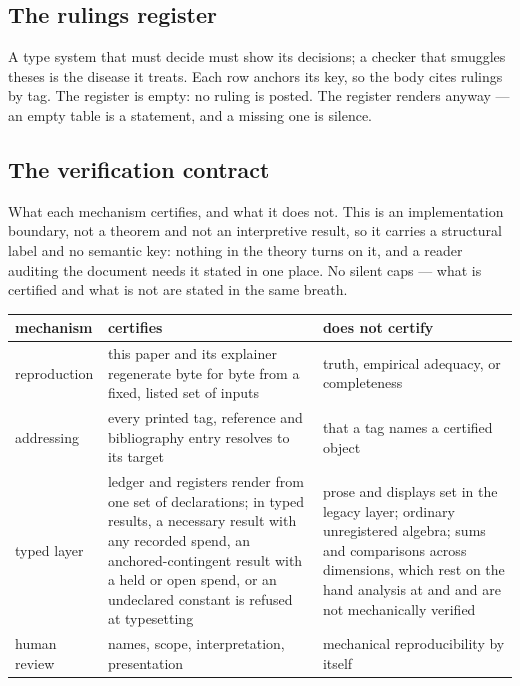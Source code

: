 \documentclass[../main]{subfiles}
\begin{document}
\subsection{The rulings register}
\label{subsec:ledger:rulings}
A type system that must decide must show its decisions; a checker that smuggles theses is
the disease it treats. Each row anchors its key, so the body cites rulings by tag.
The register is empty: no ruling is posted. The register renders anyway --- an empty
table is a statement, and a missing one is silence.

\GenerateRulings

\subsection{The verification contract}
\label{subsec:ledger:verify}
What each mechanism certifies, and what it does not. This is an implementation
boundary, not a theorem and not an interpretive result, so it carries a structural
label and no semantic key: nothing in the theory turns on it, and a reader auditing
the document needs it stated in one place. No silent caps --- what is certified and
what is not are stated in the same breath.

\begin{table}[htbp]
  \centering
  \begin{tabularx}{\textwidth}{@{} l L L @{}}
    \toprule
    \textbf{mechanism} & \textbf{certifies} & \textbf{does not certify} \\
    \midrule
    reproduction & this paper and its explainer regenerate byte for byte from a
      fixed, listed set of inputs & truth, empirical adequacy, or completeness \\
    \addlinespace
    addressing & every printed tag, reference and bibliography entry resolves to
      its target & that a tag names a certified object \\
    \addlinespace
    typed layer & ledger and registers render from one set of declarations; in
      typed results, a necessary result with any recorded spend, an anchored-contingent
      result with a held or open spend, or an undeclared constant is refused at
      typesetting & prose and displays set in the legacy layer; ordinary
      unregistered algebra; sums and comparisons across dimensions, which rest on the
      hand analysis at  and  and are not
      mechanically verified \\
    \addlinespace
    human review & names, scope, interpretation, presentation & mechanical
      reproducibility by itself \\
    \bottomrule
  \end{tabularx}
\end{table}
\end{document}

